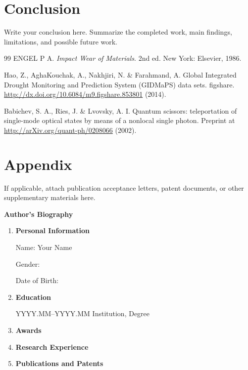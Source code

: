 \documentclass[12pt,a4paper]{report}
\newcommand{\StudentName}{Your Name}
\newcommand{\fronttitle}[1]{%
  \clearpage
  \begin{center}
    {\bfseries\fontsize{24}{28}\selectfont #1}
  \end{center}
  \vspace{1em}
}
\begin{document}
\chapter{Conclusion}

Write your conclusion here. Summarize the completed work, main findings, limitations, and possible future work.

\clearpage
{}
\begin{thebibliography}{99}
\singlespacing
{}
ENGEL P A. \textit{Impact Wear of Materials}. 2nd ed. New York: Elsevier, 1986.

Hao, Z., AghaKouchak, A., Nakhjiri, N. \& Farahmand, A. Global Integrated Drought Monitoring and Prediction System (GIDMaPS) data sets. figshare. \url{http://dx.doi.org/10.6084/m9.figshare.853801} (2014).

Babichev, S. A., Ries, J. \& Lvovsky, A. I. Quantum scissors: teleportation of single-mode optical states by means of a nonlocal single photon. Preprint at \url{http://arXiv.org/quant-ph/0208066} (2002).
\end{thebibliography}
\doublespacing

\appendix
\chapter*{Appendix}

If applicable, attach publication acceptance letters, patent documents, or other supplementary materials here.

\fronttitle{Author's Biography}
\onehalfspacing

\begin{enumerate}[leftmargin=*,label=\arabic*.]
\item \textbf{Personal Information}

Name: \StudentName

Gender:

Date of Birth:

\item \textbf{Education}

YYYY.MM--YYYY.MM \quad Institution, Degree

\item \textbf{Awards}

\item \textbf{Research Experience}

\item \textbf{Publications and Patents}
\end{enumerate}
\doublespacing
\end{document}
